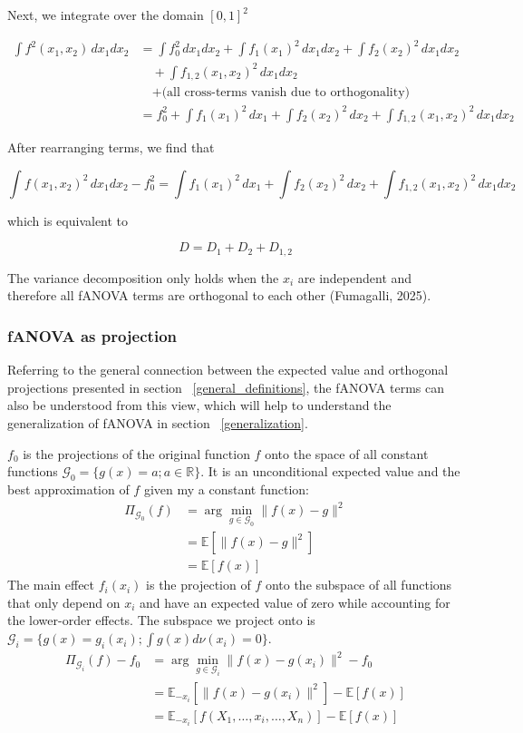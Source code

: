 \vspace{1em}

Next, we integrate over the domain \( [0,1]^2 \)

\begin{align*}
\int f^2(x_1, x_2) \, dx_1 dx_2 &= \int f_0^2 \, dx_1 dx_2 + \int f_1(x_1)^2 \, dx_1 dx_2 + \int f_2(x_2)^2 \, dx_1 dx_2 \\
&\quad + \int f_{1,2}(x_1, x_2)^2 \, dx_1 dx_2 \\
&\quad + \text{(all cross-terms vanish due to orthogonality)} \\
&= f_0^2 + \int f_1(x_1)^2 \, dx_1 + \int f_2(x_2)^2 \, dx_2 + \int f_{1,2}(x_1, x_2)^2 \, dx_1 dx_2
\end{align*}

\vspace{1em}

After rearranging terms, we find that

\[
\int f(x_1, x_2)^2 \, dx_1 dx_2 - f_0^2 = \int f_1(x_1)^2 \, dx_1 + \int f_2(x_2)^2 \, dx_2 + \int f_{1,2}(x_1, x_2)^2 \, dx_1 dx_2
\]

which is equivalent to 

\[
D = D_1 + D_2 + D_{1,2}
\]

The variance decomposition only holds when the $x_i$ are independent and therefore all fANOVA terms are orthogonal to each other (Fumagalli, 2025).

\subsubsection*{fANOVA as projection}
Referring to the general connection between the expected value and orthogonal projections presented in section ~\ref{general_definitions}, the fANOVA terms can also be understood from this view, which will help to understand the generalization of fANOVA in section ~\ref{generalization}.\par

$f_0$ is the projections of the original function $f$ onto the space of all constant functions $\mathcal{G}_0 = \{g(x) = a; a \in \mathbb{R}\}$. It is an unconditional expected value and the best approximation of $f$ given my a constant function:
\begin{align*}
    \Pi_{\mathcal{G}_0}(f) 
    &= \arg \min_{g \in \mathcal{G}_0} \|f(x) - g\|^2 \\
    &= \mathbb{E}[\|f(x) - g\|^2] \\
    &= \mathbb{E}[f(x)]
\end{align*}
The main effect $f_i(x_i)$ is the projection of $f$ onto the subspace of all functions that only depend on $x_i$ and have an expected value of zero while accounting for the lower-order effects. The subspace we project onto is $\mathcal{G}_i = \{g(x) = g_i(x_i); \int g(x) d\nu (x_i) = 0\}$.
\begin{align*}
    \Pi_{\mathcal{G}_i}(f) - f_0
    &= \arg \min_{g \in \mathcal{G}_i} \|f(x) - g(x_i)\|^2 - f_0\\
    &= \mathbb{E}_{-x_i}[\|f(x) - g(x_i)\|^2] - \mathbb{E}[f(x)] \\
    &= \mathbb{E}_{-x_i}[f(X_1, \dots, x_i, \dots, X_n)] - \mathbb{E}[f(x)]
\end{align*}

